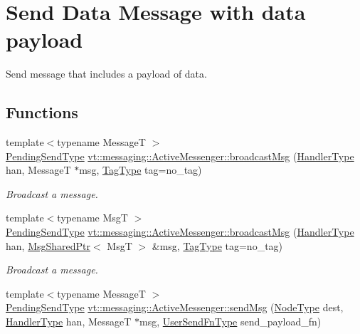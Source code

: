 \hypertarget{group__sendpayload}{}\section{Send Data Message with data payload}
\label{group__sendpayload}


Send message that includes a payload of data.  


\subsection*{Functions}
\begin{DoxyCompactItemize}
\item 
{\footnotesize template$<$typename MessageT $>$ }\\\hyperlink{structvt_1_1messaging_1_1_active_messenger_a3626a6ca76d8ad4ec7c3b47a2c70d3a8}{Pending\+Send\+Type} \hyperlink{group__sendpayload_ga90a75f1f1bbff156dca7a2237eec1800}{vt\+::messaging\+::\+Active\+Messenger\+::broadcast\+Msg} (\hyperlink{namespacevt_af64846b57dfcaf104da3ef6967917573}{Handler\+Type} han, MessageT $\ast$msg, \hyperlink{namespacevt_a84ab281dae04a52a4b243d6bf62d0e52}{Tag\+Type} tag=no\+\_\+tag)
\begin{DoxyCompactList}\small\item\em Broadcast a message. \end{DoxyCompactList}\item 
{\footnotesize template$<$typename MsgT $>$ }\\\hyperlink{structvt_1_1messaging_1_1_active_messenger_a3626a6ca76d8ad4ec7c3b47a2c70d3a8}{Pending\+Send\+Type} \hyperlink{group__sendpayload_ga115fefe8db464acf9c2da0fe6469cb86}{vt\+::messaging\+::\+Active\+Messenger\+::broadcast\+Msg} (\hyperlink{namespacevt_af64846b57dfcaf104da3ef6967917573}{Handler\+Type} han, \hyperlink{structvt_1_1messaging_1_1_msg_shared_ptr}{Msg\+Shared\+Ptr}$<$ MsgT $>$ \&msg, \hyperlink{namespacevt_a84ab281dae04a52a4b243d6bf62d0e52}{Tag\+Type} tag=no\+\_\+tag)
\begin{DoxyCompactList}\small\item\em Broadcast a message. \end{DoxyCompactList}\item 
{\footnotesize template$<$typename MessageT $>$ }\\\hyperlink{structvt_1_1messaging_1_1_active_messenger_a3626a6ca76d8ad4ec7c3b47a2c70d3a8}{Pending\+Send\+Type} \hyperlink{group__sendpayload_ga946e8ef3e8e2430b70ff09dd555bc837}{vt\+::messaging\+::\+Active\+Messenger\+::send\+Msg} (\hyperlink{namespacevt_a866da9d0efc19c0a1ce79e9e492f47e2}{Node\+Type} dest, \hyperlink{namespacevt_af64846b57dfcaf104da3ef6967917573}{Handler\+Type} han, MessageT $\ast$msg, \hyperlink{structvt_1_1messaging_1_1_active_messenger_a4b1993ad77436b6ed6c7fd32801c50ed}{User\+Send\+Fn\+Type} send\+\_\+payload\+\_\+fn)

\end{DoxyCompactItemize}
